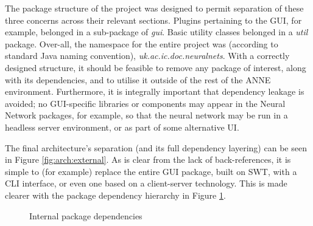 \documentclass{acm_proc_article-sp}
\begin{document}
{The package structure of the project was designed to permit separation of these three concerns across their relevant sections. Plugins pertaining to the GUI, for example, belonged in a sub{}-package of {\textit{gui}}. Basic utility classes belonged in a {\textit{util}} package. Over{}-all, the namespace for the entire project was (according to standard Java naming convention), {\textit{uk.ac.ic.doc.neuralnets}}. With a correctly designed structure, it should be feasible to remove any package of interest, along with its dependencies, and to utilise it outside of the rest of the ANNE environment. Furthermore, it is integrally important that dependency leakage is avoided; no GUI{}-specific libraries or components may appear in the Neural Network packages, for example, so that the neural network may be run in a headless server environment, or as part of some alternative UI.

The final architecture's separation (and its full dependency layering) can be seen in Figure \ref{fig:arch:external}. As is clear from the lack of back{}-references, it is simple to (for example) replace the entire GUI package, built on SWT, with a CLI interface, or even one based on a client{}-server technology. This is made clearer with the package dependency hierarchy in Figure \ref{fig:arch:internal}.

\begin{figure}[t]
\centering
{}
\caption{Internal package dependencies}
\label{fig:arch:internal}
\end{figure} 
}
\end{document}
